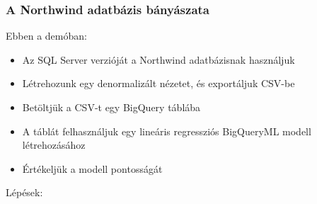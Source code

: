 \documentclass[
  magyar,
]{article}
\providecommand{\tightlist}{%
  \setlength{\itemsep}{0pt}\setlength{\parskip}{0pt}}
\begin{document}
\subsubsection{A Northwind adatbázis
bányászata}\label{a-northwind-adatbuxe1zis-buxe1nyuxe1szata}

Ebben a demóban:

\begin{itemize}
\tightlist
\item
  Az SQL Server verzióját a Northwind adatbázisnak használjuk
\item
  Létrehozunk egy denormalizált nézetet, és exportáljuk CSV-be
\item
  Betöltjük a CSV-t egy BigQuery táblába
\item
  A táblát felhasználjuk egy lineáris regressziós BigQueryML modell
  létrehozásához
\item
  Értékeljük a modell pontosságát
\end{itemize}

Lépések:
\end{document}
